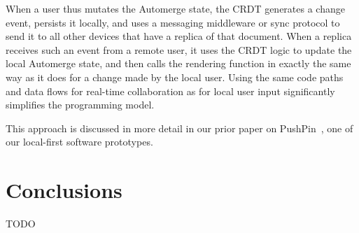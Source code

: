 \documentclass[sigconf]{acmart}
\begin{document}
When a user thus mutates the Automerge state, the CRDT generates a change event, persists it locally, and uses a messaging middleware or sync protocol to send it to all other devices that have a replica of that document.
When a replica receives such an event from a remote user, it uses the CRDT logic to update the local Automerge state, and then calls the rendering function in exactly the same way as it does for a change made by the local user.
Using the same code paths and data flows for real-time collaboration as for local user input significantly simplifies the programming model.

This approach is discussed in more detail in our prior paper on PushPin~\cite{vanHardenberg:2020}, one of our local-first software prototypes.

\section{Conclusions}

TODO


{}
\end{document}
